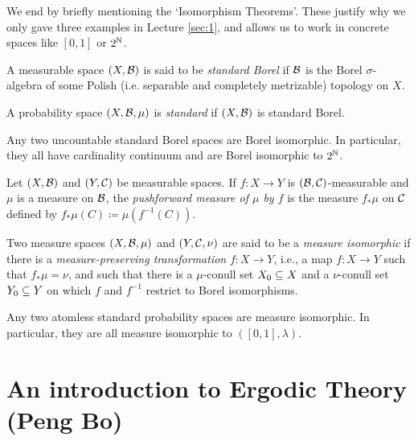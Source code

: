 \documentclass[reqno, twoside]{article}
\begin{document}
    We end by briefly mentioning the `Isomorphism Theorems'. These justify why we only gave three examples in Lecture \ref{sec:1}, and allows us to work in concrete spaces like $[0,1]$ or $2^{\mathbb{N}}$.

    \begin{definition}
        A measurable space $(X,\mathcal{B})$ is said to be \textit{standard Borel} if $\mathcal{B}$ is the Borel $\sigma$-algebra of some Polish (i.e. separable and completely metrizable) topology on $X$.

        A probability space $(X,\mathcal{B},\mu)$ is \textit{standard} if $(X,\mathcal{B})$ is standard Borel.
    \end{definition}

    \begin{theorem}\label{thm:borel_isomorphism_theorem}
        Any two uncountable standard Borel spaces are Borel isomorphic. In particular, they all have cardinality continuum and are Borel isomorphic to $2^{\mathbb{N}}$.
    \end{theorem}

    \begin{definition}
        Let $(X,\mathcal{B})$ and $(Y,\mathcal{C})$ be measurable spaces. If $f:X\to Y$ is $(\mathcal{B},\mathcal{C})$-measurable and $\mu$ is a measure on $\mathcal{B}$, the \textit{pushforward measure of $\mu$ by $f$} is the measure $f_\ast\mu$ on $\mathcal{C}$ defined by $f_\ast\mu(C)\coloneqq\mu(f^{-1}(C))$.
    \end{definition}

    \begin{definition}
        Two measure spaces $(X,\mathcal{B},\mu)$ and $(Y,\mathcal{C},\nu)$ are said to be a \textit{measure isomorphic} if there is a \textit{measure-preserving transformation} $f:X\to Y$, i.e., a map $f:X\to Y$ such that $f_\ast\mu=\nu$, and such that there is a $\mu$-conull set $X_0\subseteq X$ and a $\nu$-conull set $Y_0\subseteq Y$ on which $f$ and $f^{-1}$ restrict to Borel isomorphisms.
    \end{definition}

    \begin{theorem}\label{thm:measure_isomorphism_theorem}
        Any two atomless standard probability spaces are measure isomorphic. In particular, they are all measure isomorphic to $([0,1],\lambda)$.
    \end{theorem}

    \section{An introduction to Ergodic Theory (Peng Bo)}\label{sec:3}
\end{document}
